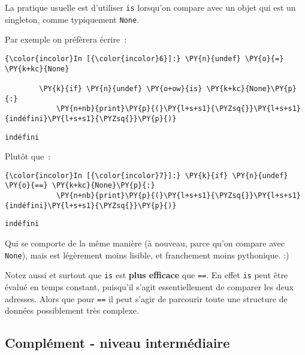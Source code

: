     La pratique usuelle est d'utiliser \texttt{is} lorsqu'on compare avec un
objet qui est un singleton, comme typiquement \texttt{None}.

    Par exemple on préfèrera écrire~:

    \begin{Verbatim}[commandchars=\\\{\},frame=single,framerule=0.3mm,rulecolor=\color{cellframecolor}]
{\color{incolor}In [{\color{incolor}6}]:} \PY{n}{undef} \PY{o}{=} \PY{k+kc}{None}
        
        \PY{k}{if} \PY{n}{undef} \PY{o+ow}{is} \PY{k+kc}{None}\PY{p}{:}
            \PY{n+nb}{print}\PY{p}{(}\PY{l+s+s1}{\PYZsq{}}\PY{l+s+s1}{indéfini}\PY{l+s+s1}{\PYZsq{}}\PY{p}{)}
\end{Verbatim}


    \begin{Verbatim}[commandchars=\\\{\},frame=single,framerule=0.3mm,rulecolor=\color{cellframecolor}]
indéfini
\end{Verbatim}

    Plutôt que~:

    \begin{Verbatim}[commandchars=\\\{\},frame=single,framerule=0.3mm,rulecolor=\color{cellframecolor}]
{\color{incolor}In [{\color{incolor}7}]:} \PY{k}{if} \PY{n}{undef} \PY{o}{==} \PY{k+kc}{None}\PY{p}{:}
            \PY{n+nb}{print}\PY{p}{(}\PY{l+s+s1}{\PYZsq{}}\PY{l+s+s1}{indéfini}\PY{l+s+s1}{\PYZsq{}}\PY{p}{)}
\end{Verbatim}


    \begin{Verbatim}[commandchars=\\\{\},frame=single,framerule=0.3mm,rulecolor=\color{cellframecolor}]
indéfini
\end{Verbatim}

    Qui se comporte de la même manière (à nouveau, parce qu'on compare avec
\texttt{None}), mais est légèrement moins lisible, et franchement moins
pythonique. :)

    Notez aussi et surtout que \texttt{is} est \textbf{plus efficace} que
\texttt{==}. En effet \texttt{is} peut être évalué en temps constant,
puisqu'il s'agit essentiellement de comparer les deux adresses. Alors
que pour \texttt{==} il peut s'agir de parcourir toute une structure de
données possiblement très complexe.

    \hypertarget{compluxe9ment---niveau-intermuxe9diaire}{%
\subsection{Complément - niveau
intermédiaire}\label{compluxe9ment---niveau-intermuxe9diaire}}

